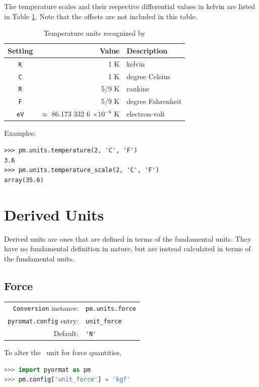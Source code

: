 The temperature scales and their respective differential values in kelvin are listed in Table \ref{tab:temperature}.  Note that the offsets are not included in this table.

\begin{table}
\centering
\caption{Temperature units recognized by \PM}\label{tab:temperature}
\begin{tabular}{crl}
\hline
Setting & Value & Description\\
\hline
\verb|K| & 1 K & kelvin\\
\verb|C| & 1 K & degree Celsius\\
\verb|R| & 5/9 K & rankine\\
\verb|F| & 5/9 K & degree Fahrenheit\\
\verb|eV| & $\approx$ 86.173 332 6 $\times 10^{-6}$ K & electron-volt\\
\hline
\end{tabular}
\end{table}

Examples:
\begin{lstlisting}
>>> pm.units.temperature(2, 'C', 'F')
3.6
>>> pm.units.temperature_scale(2, 'C', 'F')
array(35.6)
\end{lstlisting}


\section{Derived Units}

Derived units are ones that are defined in terms of the fundamental units.  They have no fundamental definition in nature, but are instead calculated in terms of the fundamental units.

%
%

\subsection{Force}\label{sec:units:force}

\begin{tabular}{rl}
\hline
\verb|Conversion| instance: & \verb|pm.units.force|\\
\verb|pyromat.config| entry: & \verb|unit_force|\\
Default: & \verb|'N'|\\
\hline
\end{tabular}
\vspace{1em}

To alter the \PM\ unit for force quantities,
\begin{lstlisting}[language=Python]
>>> import pyormat as pm
>>> pm.config['unit_force'] = 'kgf'
\end{lstlisting}

